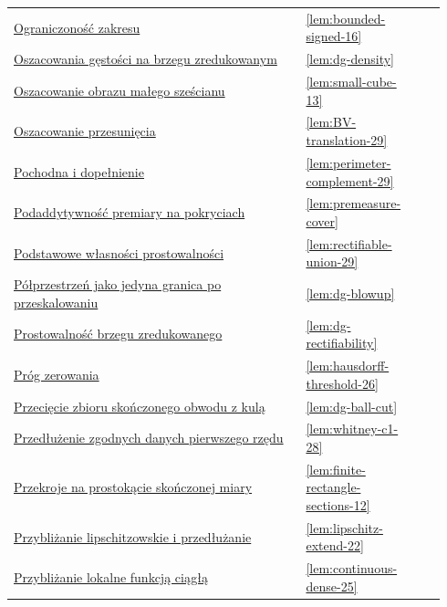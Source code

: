 \documentclass[11pt,a4paper,oneside]{book}
\numberwithin{equation}{chapter}
\theoremstyle{plain}
\theoremstyle{definition}
\theoremstyle{remark}
\begin{document}
\begin{longtable}{@{}p{0.72\linewidth}p{0.135\linewidth}p{0.08\linewidth}@{}}
\hyperref[lem:bounded-signed-16]{Ograniczoność zakresu} & \ref*{lem:bounded-signed-16} & \pageref*{lem:bounded-signed-16} \\
\hyperref[lem:dg-density]{Oszacowania gęstości na brzegu zredukowanym} & \ref*{lem:dg-density} & \pageref*{lem:dg-density} \\
\hyperref[lem:small-cube-13]{Oszacowanie obrazu małego sześcianu} & \ref*{lem:small-cube-13} & \pageref*{lem:small-cube-13} \\
\hyperref[lem:BV-translation-29]{Oszacowanie przesunięcia} & \ref*{lem:BV-translation-29} & \pageref*{lem:BV-translation-29} \\
\hyperref[lem:perimeter-complement-29]{Pochodna i dopełnienie} & \ref*{lem:perimeter-complement-29} & \pageref*{lem:perimeter-complement-29} \\
\hyperref[lem:premeasure-cover]{Podaddytywność premiary na pokryciach} & \ref*{lem:premeasure-cover} & \pageref*{lem:premeasure-cover} \\
\hyperref[lem:rectifiable-union-29]{Podstawowe własności prostowalności} & \ref*{lem:rectifiable-union-29} & \pageref*{lem:rectifiable-union-29} \\
\hyperref[lem:dg-blowup]{Półprzestrzeń jako jedyna granica po przeskalowaniu} & \ref*{lem:dg-blowup} & \pageref*{lem:dg-blowup} \\
\hyperref[lem:dg-rectifiability]{Prostowalność brzegu zredukowanego} & \ref*{lem:dg-rectifiability} & \pageref*{lem:dg-rectifiability} \\
\hyperref[lem:hausdorff-threshold-26]{Próg zerowania} & \ref*{lem:hausdorff-threshold-26} & \pageref*{lem:hausdorff-threshold-26} \\
\hyperref[lem:dg-ball-cut]{Przecięcie zbioru skończonego obwodu z kulą} & \ref*{lem:dg-ball-cut} & \pageref*{lem:dg-ball-cut} \\
\hyperref[lem:whitney-c1-28]{Przedłużenie zgodnych danych pierwszego rzędu} & \ref*{lem:whitney-c1-28} & \pageref*{lem:whitney-c1-28} \\
\hyperref[lem:finite-rectangle-sections-12]{Przekroje na prostokącie skończonej miary} & \ref*{lem:finite-rectangle-sections-12} & \pageref*{lem:finite-rectangle-sections-12} \\
\hyperref[lem:lipschitz-extend-22]{Przybliżanie lipschitzowskie i przedłużanie} & \ref*{lem:lipschitz-extend-22} & \pageref*{lem:lipschitz-extend-22} \\
\hyperref[lem:continuous-dense-25]{Przybliżanie lokalne funkcją ciągłą} & \ref*{lem:continuous-dense-25} & \pageref*{lem:continuous-dense-25} \\

\end{longtable}
\end{document}
